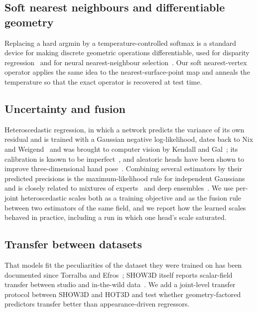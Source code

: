\subsection{Soft nearest neighbours and differentiable geometry}
Replacing a hard argmin by a temperature-controlled softmax is a standard device for making discrete geometric operations differentiable, used for disparity regression~\cite{kendall2017gcnet} and for neural nearest-neighbour selection~\cite{plotz2018n3net}. Our soft nearest-vertex operator applies the same idea to the nearest-surface-point map and anneals the temperature so that the exact operator is recovered at test time.

\subsection{Uncertainty and fusion}
Heteroscedastic regression, in which a network predicts the variance of its own residual and is trained with a Gaussian negative log-likelihood, dates back to Nix and Weigend~\cite{nix1994estimating} and was brought to computer vision by Kendall and Gal~\cite{kendall2017uncertainties}; its calibration is known to be imperfect~\cite{guo2017calibration}, and aleatoric heads have been shown to improve three-dimensional hand pose~\cite{lee2025correlation}. Combining several estimators by their predicted precisions is the maximum-likelihood rule for independent Gaussians and is closely related to mixtures of experts~\cite{jacobs1991adaptive} and deep ensembles~\cite{lakshminarayanan2017ensembles}. We use per-joint heteroscedastic scales both as a training objective and as the fusion rule between two estimators of the same field, and we report how the learned scales behaved in practice, including a run in which one head's scale saturated.

\subsection{Transfer between datasets}
That models fit the peculiarities of the dataset they were trained on has been documented since Torralba and Efros~\cite{torralba2011unbiased}; SHOW3D itself reports scalar-field transfer between studio and in-the-wild data~\cite{rim2026show3d}. We add a joint-level transfer protocol between SHOW3D and HOT3D and test whether geometry-factored predictors transfer better than appearance-driven regressors.
